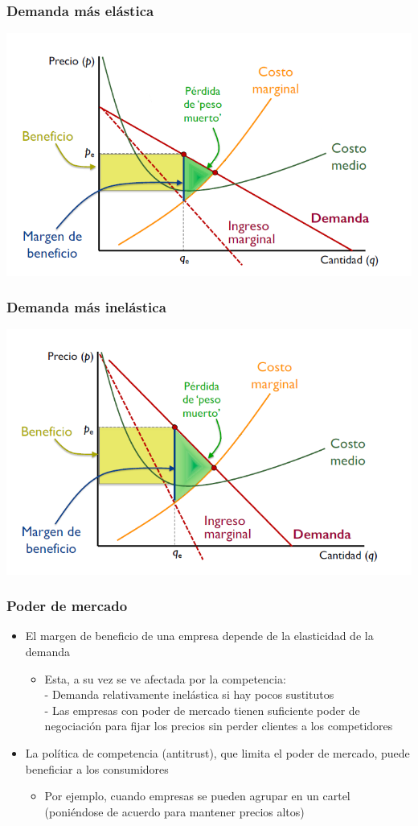 \documentclass{beamer}
\begin{document}
\begin{frame}
\frametitle{Demanda más elástica}
\includegraphics[scale=0.6]{Figures/Tema_06.47_elasticidad3.png}
\end{frame}

\begin{frame}
\frametitle{Demanda más inelástica}
\includegraphics[scale=0.6]{Figures/Tema_06.48_elasticidad4.png}
\end{frame}

\begin{frame}
\frametitle{Poder de mercado}
\begin{itemize}
    \item El margen de beneficio de una empresa depende de la elasticidad de la demanda
    \begin{itemize}
        \item Esta, a su vez se ve afectada por la competencia: \\
        - Demanda relativamente inelástica si hay pocos sustitutos \\
        - Las empresas con poder de mercado tienen suficiente poder de negociación para fijar los precios sin perder clientes a los competidores 
    \end{itemize}
    \item La política de competencia (antitrust), que limita el poder de mercado, puede beneficiar a los consumidores
    \begin{itemize}
        \item Por ejemplo, cuando empresas se pueden agrupar en un cartel (poniéndose de acuerdo para mantener precios altos)
    \end{itemize}
\end{itemize}
\end{frame}
\end{document}
